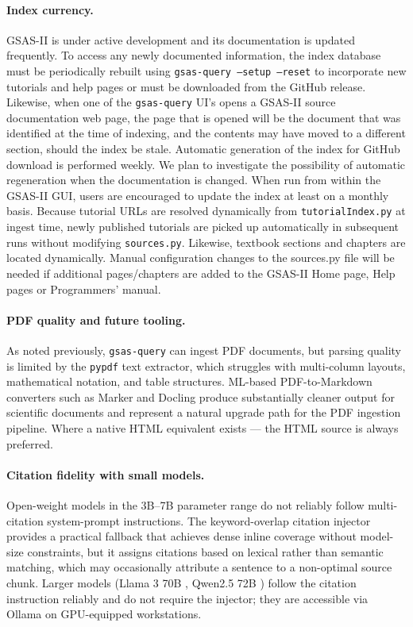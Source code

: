 \paragraph{Index currency.}
GSAS-II is under active development and its documentation is updated
frequently.
To access any newly documented information, the index database must be periodically rebuilt using \texttt{gsas-query --setup --reset} to incorporate new tutorials and
help pages or must be downloaded from the GitHub release. 
Likewise, when one of the \texttt{gsas-query} UI's opens a GSAS-II source documentation web page, the page that is opened will be the document that was identified at the time of indexing, and the contents may have moved to a different section, should the index be stale. 
Automatic generation of the index for GitHub download is performed weekly. We plan to investigate the possibility of automatic regeneration when the documentation is changed. 
When run from within the GSAS-II GUI, users are encouraged to update the index at least on a monthly basis. 
Because tutorial URLs are resolved dynamically from
\texttt{tutorialIndex.py} at ingest time, newly published tutorials
are picked up automatically in subsequent runs without modifying
\texttt{sources.py}. Likewise, textbook sections and chapters are located dynamically. Manual configuration changes to the sources.py file will be needed if additional pages/chapters are added to the GSAS-II Home page, Help pages or Programmers' manual.

\paragraph{PDF quality and future tooling.}
As noted previously, \texttt{gsas-query} can ingest PDF documents, but 
parsing quality is limited by the \texttt{pypdf} text extractor, which
struggles with multi-column layouts, mathematical notation, and
table structures. 
ML-based PDF-to-Markdown converters such as Marker
\citep{paruchuri2024marker} and Docling \citep{docling2024}
produce substantially cleaner output for scientific documents and
represent a natural upgrade path for the PDF ingestion pipeline.
Where a native HTML equivalent exists --- the HTML source is
always preferred.

\paragraph{Citation fidelity with small models.}
Open-weight models in the 3B--7B parameter range do not reliably follow
multi-citation system-prompt instructions.
The keyword-overlap citation injector provides a practical fallback
that achieves dense inline coverage without model-size constraints,
but it assigns citations based on lexical rather than semantic
matching, which may occasionally attribute a sentence to a
non-optimal source chunk.
Larger models (Llama 3 70B \citep{meta2024llama3}, Qwen2.5 72B \citep{qwen2025}) follow the citation
instruction reliably and do not require the injector; they are
accessible via Ollama on GPU-equipped workstations.

